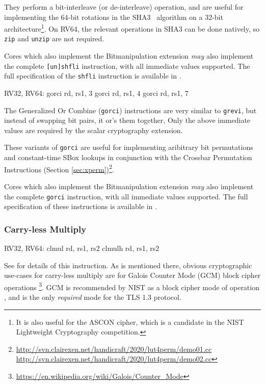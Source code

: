 They perform a bit-interleave (or de-interleave) operation, and are
useful for implementing the 64-bit rotations in the
SHA3~\cite{nist:fips:202} algorithm on
a 32-bit architecture\footnote{
It is also useful for the ASCON cipher, which is a candidate in the
NIST Lightweight Cryptography competition.
}.
On RV64, the relevant operations in SHA3 can be done natively, so
{\tt zip} and {\tt unzip} are not required.

Cores which also implement the Bitmanipulation extension {\em may} also
implement the complete {\tt [un]shfli} instruction, with all immediate values
supported.
The full specification of the {\tt shfli} instruction is available in
\cite[Section 2.2.3]{riscv:bitmanip:draft}.

\begin{cryptobitmanipisa}
RV32, RV64:             
    gorci   rd, rs1, 3
    gorci   rd, rs1, 4
    gorci   rd, rs1, 7
\end{cryptobitmanipisa}

The Generalized Or Combine ({\tt gorci}) instructions are very similar
to {\tt grevi}, but instead of swapping bit pairs, it or's them together,
Only the above immediate values are required by the scalar cryptography
extension.

These variants of {\tt gorci} are
useful for implementing aribitrary bit permutations and
constant-time SBox lookups in
conjunction with the Crossbar Permutation Instructions
(Section \ref{sec:xperm})\footnote{
\url{http://svn.clairexen.net/handicraft/2020/lut4perm/demo01.cc}
\url{http://svn.clairexen.net/handicraft/2020/lut4perm/demo02.cc}
}.

Cores which also implement the Bitmanipulation extension {\em may} also
implement the complete {\tt gorci} instruction, with all immediate values
supported.
The full specification of these instructions is available in
\cite[Section 2.3]{riscv:bitmanip:draft}.

\subsubsection{Carry-less Multiply}

\begin{cryptobitmanipisa}
RV32, RV64:
    clmul  rd, rs1, rs2
    clmulh rd, rs1, rs2
\end{cryptobitmanipisa}

See \cite[Section 2.6]{riscv:bitmanip:draft} for details of
this instruction.
As is mentioned there, obvious cryptographic use-cases for carry-less
multiply are for Galois Counter Mode (GCM) block cipher operations
\footnote{\url{https://en.wikipedia.org/wiki/Galois/Counter_Mode}}.
GCM is recommended by NIST as a block cipher mode of operation
\cite{nist:gcm}, and is the only {\em required} mode for the TLS 1.3
protocol.

